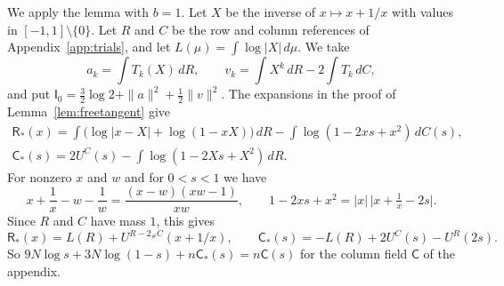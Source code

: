 We apply the lemma with $b=1$. Let $X$ be the inverse of $x\mapsto x+1/x$ with values in $[-1,1]\setminus\{0\}$. Let $R$ and $C$ be the row and column references of Appendix~\ref{app:trials},
and let $L(\mu)=\int\log|X|\,d\mu$. We take
\[
 a_k=\int T_k(X)\,dR,\qquad v_k=\int X^k\,dR-2\int T_k\,dC,
\]
and put $\mathsf I_0=\frac32\log2+\|a\|^2+\frac12\|v\|^2$. The expansions in the proof of Lemma~\ref{lem:freetangent} give
\begin{gather*}
 \mathsf R_*(x)=\int\bigl(\log|x-X|+\log(1-xX)\bigr)\,dR-\int\log(1-2xs+x^2)\,dC(s),\\
 \mathsf C_*(s)=2U^C(s)-\int\log(1-2Xs+X^2)\,dR.
\end{gather*}
For nonzero $x$ and $w$ and for $0<s<1$ we have
\begin{equation}\label{eq:jouk}
 x+\frac1x-w-\frac1w=\frac{(x-w)(xw-1)}{xw},\qquad 1-2xs+x^2=|x|\,\bigl|x+\tfrac1x-2s\bigr|.
\end{equation}
Since $R$ and $C$ have mass $1$, this gives
\[
 \mathsf R_*(x)=L(R)+U^{R-2_\#C}(x+1/x),\qquad \mathsf C_*(s)=-L(R)+2U^C(s)-U^R(2s).
\]
So $9N\log s+3N\log(1-s)+n\mathsf C_*(s)=n\mathsf C(s)$ for the column field $\mathsf C$ of the appendix.

